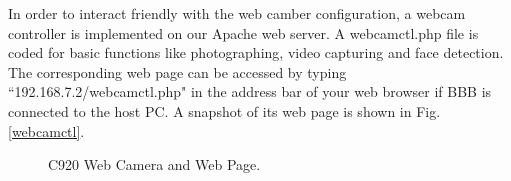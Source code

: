 \documentclass[12pt,journal,draftclsnofoot,onecolumn]{IEEEtran}
\begin{document}
In order to interact friendly with the web camber configuration, a webcam controller is implemented on our Apache web server. A webcamctl.php file is coded for basic functions like photographing, video capturing and face detection. The corresponding web page can be accessed by typing ``192.168.7.2/webcamctl.php" in the address bar of your web browser if BBB is connected to the host PC.  A snapshot of its web page is shown in Fig.\ref{webcamctl}.


\begin{figure}[htb]
	\centering

     \caption{C920 Web Camera and Web Page.}\label{webcam}
     \end{figure}
\end{document}

